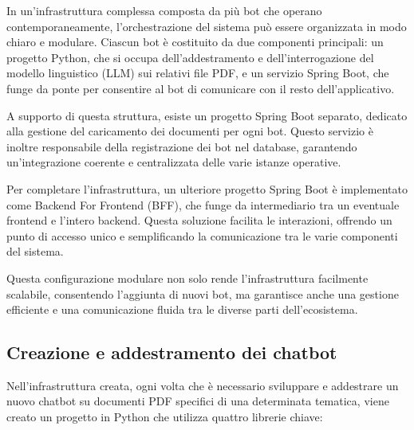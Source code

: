 \documentclass[a4paper,twoside,12pt]{toptesi}
\begin{document}
\begin{center}

\end{center}

In un'infrastruttura complessa composta da più bot che operano contemporaneamente, l'orchestrazione del sistema può essere organizzata in modo chiaro e modulare. Ciascun bot è costituito da due componenti principali: un progetto Python, che si occupa dell'addestramento e dell'interrogazione del modello linguistico (LLM) sui relativi file PDF, e un servizio Spring Boot, che funge da ponte per consentire al bot di comunicare con il resto dell'applicativo.

A supporto di questa struttura, esiste un progetto Spring Boot separato, dedicato alla gestione del caricamento dei documenti per ogni bot. Questo servizio è inoltre responsabile della registrazione dei bot nel database, garantendo un'integrazione coerente e centralizzata delle varie istanze operative.

Per completare l'infrastruttura, un ulteriore progetto Spring Boot è implementato come Backend For Frontend (BFF), che funge da intermediario tra un eventuale frontend e l'intero backend. Questa soluzione facilita le interazioni, offrendo un punto di accesso unico e semplificando la comunicazione tra le varie componenti del sistema.

Questa configurazione modulare non solo rende l'infrastruttura facilmente scalabile, consentendo l'aggiunta di nuovi bot, ma garantisce anche una gestione efficiente e una comunicazione fluida tra le diverse parti dell'ecosistema.

\subsection{Creazione e addestramento dei chatbot}

Nell'infrastruttura creata, ogni volta che è necessario sviluppare e addestrare un nuovo chatbot su documenti PDF specifici di una determinata tematica, viene creato un progetto in Python che utilizza quattro librerie chiave:
\end{document}
